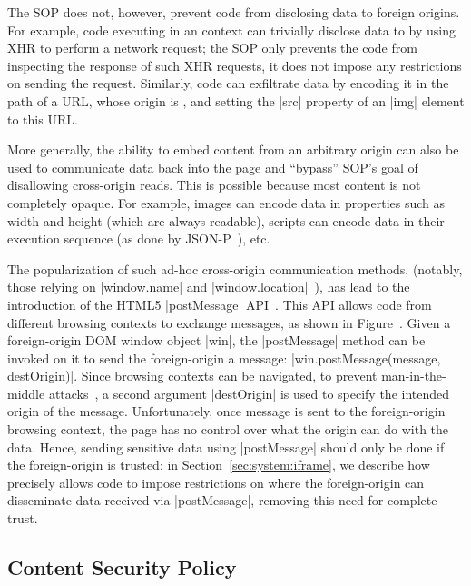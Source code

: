 The SOP does not, however, prevent code from disclosing data to
foreign origins.
%
For example, code executing in an  context can trivially
disclose data to  by using XHR to perform a network
request; the SOP only prevents the code from inspecting the response
of such XHR requests, it does not impose any restrictions on sending
the request.
%
Similarly, code can exfiltrate data by encoding it in the path of a
URL, whose origin is , and setting the \js|src| property
of an \js|img| element to this URL.

More generally, the ability to embed content from an arbitrary origin
can also be used to communicate data back into the page and ``bypass''
SOP's goal of disallowing cross-origin reads.
%
This is possible because most content is not completely opaque. 
%
For example, images can encode data in properties such as width and
height (which are always readable), scripts can encode data in their
execution sequence (as done by JSON-P~\cite{jsonp}), etc.
%

The popularization of such ad-hoc cross-origin communication methods,
(notably, those relying on \js|window.name| and
\js|window.location|~\cite{thidpartyjs}), has lead to the
introduction of the HTML5 \js|postMessage| API~\cite{webmessaging}.
%
This API allows code from different browsing contexts to exchange
messages, as shown in Figure~.
%
Given a foreign-origin DOM window object \js|win|, the
\js|postMessage| method can be invoked on it to send the
foreign-origin a message: \js|win.postMessage(message, destOrigin)|.
%
Since browsing contexts can be navigated, to prevent man-in-the-middle
attacks~\cite{barth2009securing}, a second argument
\js|destOrigin| is used to specify the intended origin of the message.
%
Unfortunately, once message is sent to the foreign-origin browsing
context, the page has no control over what the origin can do with the
data.
%
Hence, sending sensitive data using \js|postMessage| should only be
done if the foreign-origin is trusted;
%
in Section~\ref{sec:system:iframe}, we describe how \sys{} precisely
allows code to impose restrictions on where the foreign-origin can
disseminate data received via \js|postMessage|, removing this need for
complete trust.

\subsection{Content Security Policy} 
\label{sec:background:csp}

